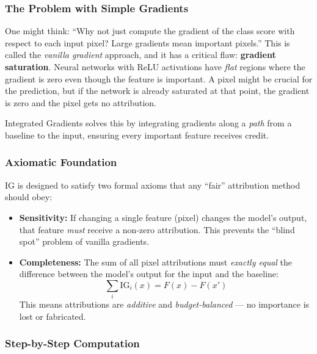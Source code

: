 \documentclass[12pt, a4paper]{article}
\begin{document}
\subsubsection{The Problem with Simple Gradients}

One might think: ``Why not just compute the gradient of the class score with
respect to each input pixel?  Large gradients mean important pixels.''  This
is called the \emph{vanilla gradient} approach, and it has a critical flaw:
\textbf{gradient saturation}.  Neural networks with ReLU activations have
\emph{flat} regions where the gradient is zero even though the feature is
important.  A pixel might be crucial for the prediction, but if the network is
already saturated at that point, the gradient is zero and the pixel gets no
attribution.

Integrated Gradients solves this by integrating gradients along a \emph{path}
from a baseline to the input, ensuring every important feature receives credit.

\subsubsection{Axiomatic Foundation}

IG is designed to satisfy two formal axioms that any ``fair'' attribution method
should obey:

\begin{itemize}[leftmargin=*]
    \item \textbf{Sensitivity:} If changing a single feature (pixel) changes
          the model's output, that feature \emph{must} receive a non-zero
          attribution.  This prevents the ``blind spot'' problem of vanilla
          gradients.
    \item \textbf{Completeness:} The sum of all pixel attributions must
          \emph{exactly equal} the difference between the model's output for
          the input and the baseline:
          \begin{equation}
          \sum_i \text{IG}_i(x) = F(x) - F(x')
          \end{equation}
          This means attributions are \emph{additive} and
          \emph{budget-balanced} --- no importance is lost or fabricated.
\end{itemize}

\subsubsection{Step-by-Step Computation}
\end{document}
